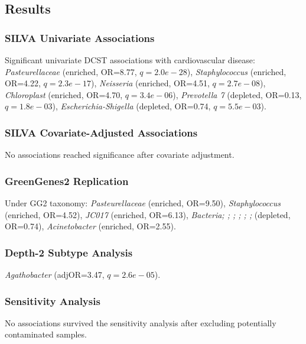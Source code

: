 \documentclass[11pt,a4paper]{article}
\begin{document}
\subsection{Results}
\subsubsection{SILVA Univariate Associations}
Significant univariate DCST associations with cardiovascular disease: \textit{Pasteurellaceae} (enriched, OR=8.77, $q=2.0e-28$), \textit{Staphylococcus} (enriched, OR=4.22, $q=2.3e-17$), \textit{Neisseria} (enriched, OR=4.51, $q=2.7e-08$), \textit{Chloroplast} (enriched, OR=4.70, $q=3.4e-06$), \textit{Prevotella 7} (depleted, OR=0.13, $q=1.8e-03$), \textit{Escherichia-Shigella} (depleted, OR=0.74, $q=5.5e-03$).

\subsubsection{SILVA Covariate-Adjusted Associations}
No associations reached significance after covariate adjustment.

\subsubsection{GreenGenes2 Replication}
Under GG2 taxonomy: \textit{Pasteurellaceae} (enriched, OR=9.50), \textit{Staphylococcus} (enriched, OR=4.52), \textit{JC017} (enriched, OR=6.13), \textit{Bacteria;  ;  ;  ;  ;  ;  } (depleted, OR=0.74), \textit{Acinetobacter} (enriched, OR=2.55).

\subsubsection{Depth-2 Subtype Analysis}
\textit{Agathobacter} (adjOR=3.47, $q=2.6e-05$).

\subsubsection{Sensitivity Analysis}
No associations survived the sensitivity analysis after excluding potentially contaminated samples.
\end{document}
